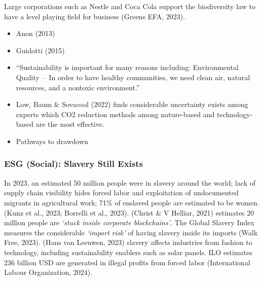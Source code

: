 \documentclass[
  letterpaper,
  DIV=11,
  numbers=noendperiod]{scrartcl}
\begin{document}
Large corporations such as Nestle and Coca Cola support the biodiversity
law to have a level playing field for business (Greens EFA, 2023).

\begin{itemize}
\item
  Anon (2013)
\item
  Guidotti (2015)
\item
  ``Sustainability is important for many reasons including:
  Environmental Quality --~In order to have healthy communities, we need
  clean air, natural resources, and a nontoxic environment.''
\item
  Low, Baum \& Sovacool (2022) finds considerable uncertainty exists
  among experts which CO2 reduction methods among nature-based and
  technology-based are the most effective.
\item
  Pathways to drawdown
\end{itemize}

\subsubsection{ESG (Social): Slavery Still
Exists}\label{esg-social-slavery-still-exists}

In 2023, an estimated 50 million people were in slavery around the
world; lack of supply chain visibility hides forced labor and
exploitation of undocumented migrants in agricultural work; 71\% of
enslaved people are estimated to be women. (Kunz et al., 2023; Borrelli
et al., 2023). (Christ \& V Helliar, 2021) estimates 20 million people
are \emph{`stuck inside corporate blockchains'}. The Global Slavery
Index measures the considerable \emph{`import risk'} of having slavery
inside its imports (Walk Free, 2023). (Hans van Leeuwen, 2023) slavery
affects industries from fashion to technology, including sustainability
enablers such as solar panels. ILO estimates 236 billion USD are
generated in illegal profits from forced labor (International Labour
Organization, 2024).
\end{document}
